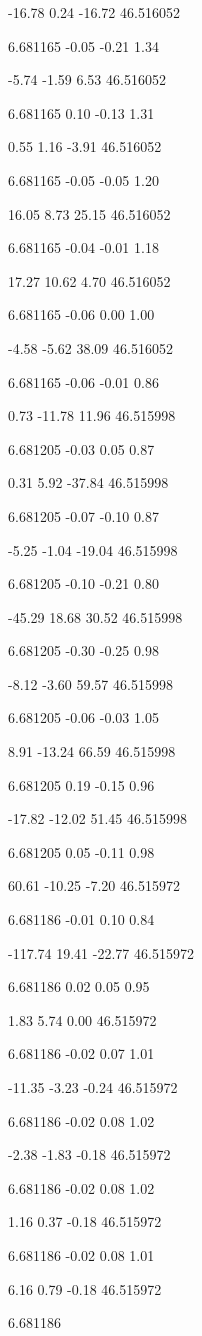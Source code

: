 -16.78
0.24
-16.72
46.516052

6.681165
-0.05
-0.21
1.34

-5.74
-1.59
6.53
46.516052

6.681165
0.10
-0.13
1.31

0.55
1.16
-3.91
46.516052

6.681165
-0.05
-0.05
1.20

16.05
8.73
25.15
46.516052

6.681165
-0.04
-0.01
1.18

17.27
10.62
4.70
46.516052

6.681165
-0.06
0.00
1.00

-4.58
-5.62
38.09
46.516052

6.681165
-0.06
-0.01
0.86

0.73
-11.78
11.96
46.515998

6.681205
-0.03
0.05
0.87

0.31
5.92
-37.84
46.515998

6.681205
-0.07
-0.10
0.87

-5.25
-1.04
-19.04
46.515998

6.681205
-0.10
-0.21
0.80

-45.29
18.68
30.52
46.515998

6.681205
-0.30
-0.25
0.98

-8.12
-3.60
59.57
46.515998

6.681205
-0.06
-0.03
1.05

8.91
-13.24
66.59
46.515998

6.681205
0.19
-0.15
0.96

-17.82
-12.02
51.45
46.515998

6.681205
0.05
-0.11
0.98

60.61
-10.25
-7.20
46.515972

6.681186
-0.01
0.10
0.84

-117.74
19.41
-22.77
46.515972

6.681186
0.02
0.05
0.95

1.83
5.74
0.00
46.515972

6.681186
-0.02
0.07
1.01

-11.35
-3.23
-0.24
46.515972

6.681186
-0.02
0.08
1.02

-2.38
-1.83
-0.18
46.515972

6.681186
-0.02
0.08
1.02

1.16
0.37
-0.18
46.515972

6.681186
-0.02
0.08
1.01

6.16
0.79
-0.18
46.515972

6.681186